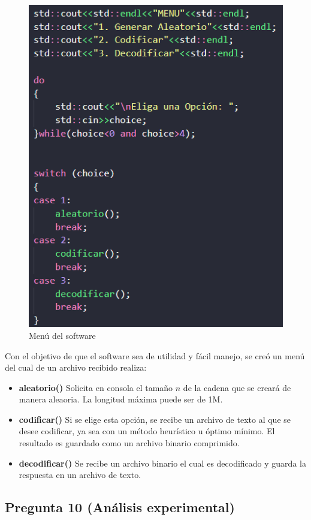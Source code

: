 \begin{figure}[H]
    \centering
    \includegraphics[scale = 0.4]{imagenes/software.png}
    \caption{Menú del software}
\end{figure}

Con el objetivo de que el software sea de utilidad y fácil manejo, se creó un menú del cual
de un archivo recibido realiza:

\begin{itemize}
    \item \textbf{aleatorio()}
    Solicita en consola el tamaño $n$ de la cadena que se creará de manera aleaoria. La longitud máxima puede ser de 1M.
    \item \textbf{codificar()}
    Si se elige esta opción, se recibe un archivo de texto al que se desee codificar, ya sea con un método heurístico u 
    óptimo mínimo. El resultado es guardado como un archivo binario comprimido.
    \item \textbf{decodificar()}
    Se recibe un archivo binario el cual es decodificado y guarda la respuesta en un archivo de texto.
\end{itemize}


\subsection{Pregunta 10 (Análisis experimental)}

